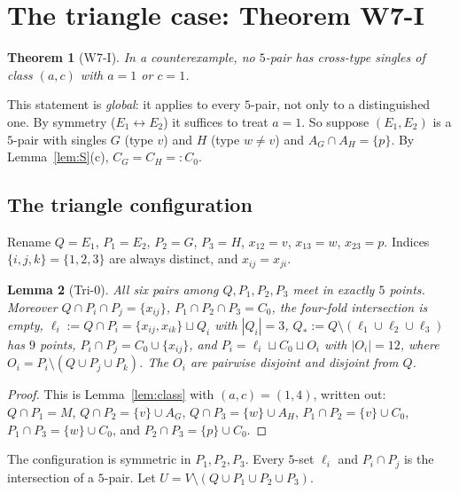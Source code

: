 \documentclass[11pt]{amsart}
\newtheorem{theorem}{Theorem}[section]
\newtheorem{lemma}[theorem]{Lemma}
\theoremstyle{definition}
\begin{document}
\section{The triangle case: Theorem W7-I}\label{sec:W7I}

\begin{theorem}[W7-I]\label{thm:W7I}
In a counterexample, no $5$-pair has cross-type singles of class $(a,c)$ with $a=1$ or $c=1$.
\end{theorem}

This statement is \emph{global}: it applies to every $5$-pair, not only to a distinguished one. By symmetry ($E_1\leftrightarrow E_2$) it suffices to treat $a=1$. So suppose $(E_1,E_2)$ is a $5$-pair with singles $G$ (type $v$) and $H$ (type $w\ne v$) and $A_G\cap A_H=\{p\}$. By Lemma~\ref{lem:S}(c), $C_G=C_H=:C_0$.

\subsection{The triangle configuration}
Rename $Q=E_1$, $P_1=E_2$, $P_2=G$, $P_3=H$, $x_{12}=v$, $x_{13}=w$, $x_{23}=p$. Indices $\{i,j,k\}=\{1,2,3\}$ are always distinct, and $x_{ij}=x_{ji}$.

\begin{lemma}[Tri-0]\label{lem:tri0}
All six pairs among $Q,P_1,P_2,P_3$ meet in exactly $5$ points. Moreover $Q\cap P_i\cap P_j=\{x_{ij}\}$, $P_1\cap P_2\cap P_3=C_0$, the four-fold intersection is empty, $\ell_i:=Q\cap P_i=\{x_{ij},x_{ik}\}\sqcup Q_i$ with $|Q_i|=3$, $Q_*:=Q\setminus(\ell_1\cup\ell_2\cup\ell_3)$ has $9$ points, $P_i\cap P_j=C_0\cup\{x_{ij}\}$, and $P_i=\ell_i\sqcup C_0\sqcup O_i$ with $|O_i|=12$, where $O_i=P_i\setminus(Q\cup P_j\cup P_k)$. The $O_i$ are pairwise disjoint and disjoint from $Q$.
\end{lemma}
\begin{proof}
This is Lemma~\ref{lem:class} with $(a,c)=(1,4)$, written out: $Q\cap P_1=M$, $Q\cap P_2=\{v\}\cup A_G$, $Q\cap P_3=\{w\}\cup A_H$, $P_1\cap P_2=\{v\}\cup C_0$, $P_1\cap P_3=\{w\}\cup C_0$, and $P_2\cap P_3=\{p\}\cup C_0$.
\end{proof}

The configuration is symmetric in $P_1,P_2,P_3$. Every $5$-set $\ell_i$ and $P_i\cap P_j$ is the intersection of a $5$-pair. Let $U=V\setminus(Q\cup P_1\cup P_2\cup P_3)$.
\end{document}
